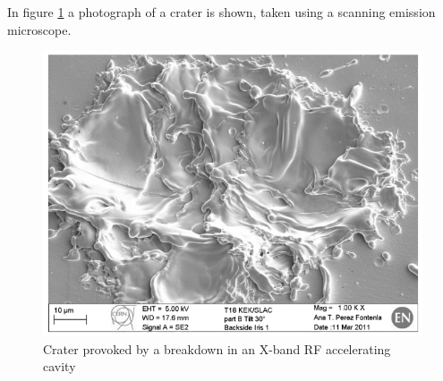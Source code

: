 In figure \ref{SEM_crater} a photograph of a crater is shown, taken using a scanning emission microscope.
\begin{figure}[h]
\centering
\includegraphics[scale=0.5]{pictures/crater}
\caption{Crater provoked by a breakdown in an X-band RF accelerating cavity \cite{Wuensch:advaces}}
\label{SEM_crater}
\end{figure}



